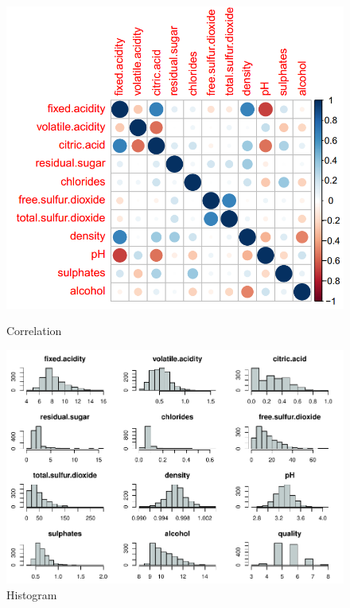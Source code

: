 \documentclass{article}
\begin{document}
\begin{figure}[H]
\begin{minipage}[]{.4\textwidth}
    \centering
    \includegraphics[scale=0.5]{Correlation.PNG}
    \caption{Correlation}
    \label{fig:Cor}
\end{minipage}
\hspace{0.5cm}
\begin{minipage}[]{.6\textwidth}
    \centering
    \includegraphics[scale=0.6]{Hist.pdf}
    \caption{Histogram}
    \label{fig:Hist}
\end{minipage}
\end{figure}
\end{document}
